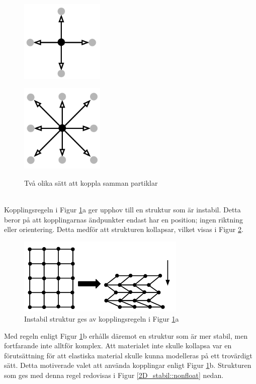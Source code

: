 \documentclass[a4paper,12pt,oneside,final,swedish]{extarticle}
\begin{document}
\begin{figure}[h]
  \begin{minipage}[h!]{.5\linewidth}
    \centering
    \includegraphics[width=4cm]{Bilder/2D_4Neighbors.png} 
    \label{fig:1a}
  \end{minipage}
  \begin{minipage}[h!]{.5\linewidth}
    \centering
    \includegraphics[width=4cm]{Bilder/2D_8Neighbors.png} 
    \label{fig:1b}
  \end{minipage}
  \caption{Två olika sätt att koppla samman partiklar}
  \label{2D_Neighbors::nonfloat}
\end{figure}

\noindent \\Kopplingsregeln i Figur \ref{2D_Neighbors::nonfloat}a ger upphov till en struktur som är instabil. Detta beror på att kopplingarnas ändpunkter endast har en position; ingen riktning eller orientering. Detta medför att strukturen kollapsar, vilket visas i Figur \ref{2D_Instabil::nonfloat}.

\begin{figure}[h!]
  \begin{center}
    \includegraphics[width=8cm]{Bilder/2D_Instabil.png} 
  \end{center}
  \caption{Instabil struktur ges av kopplingsregeln i Figur \ref{2D_Neighbors::nonfloat}a}
  \label{2D_Instabil::nonfloat}
\end{figure}
\pagebreak
\noindent Med regeln enligt Figur \ref{2D_Neighbors::nonfloat}b erhålls däremot en struktur som är mer stabil, men fortfarande inte alltför komplex. Att materialet inte skulle kollapsa var en förutsättning för att elastiska material skulle kunna modelleras på ett trovärdigt sätt. Detta motiverade valet att använda kopplingar enligt Figur \ref{2D_Neighbors::nonfloat}b. Strukturen som ges med denna regel redovisas i Figur \ref{2D_stabil::nonfloat} nedan.
\end{document}

